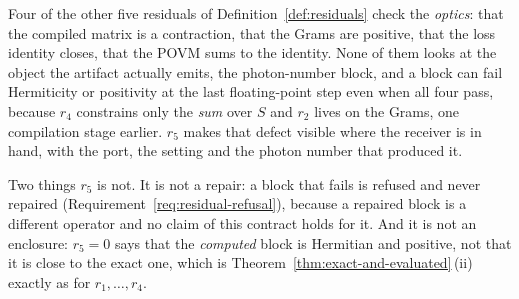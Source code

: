 
\begin{remark}\label{rem:res5why}
Four of the other five residuals of Definition~\ref{def:residuals} check the
\emph{optics}: that the compiled matrix is a contraction, that the Grams are
positive, that the loss identity closes, that the POVM sums to the identity.
None of them looks at the object the artifact actually emits, the
photon-number block, and a block can fail Hermiticity or positivity at the last
floating-point step even when all four pass, because $r_4$ constrains only the
\emph{sum} over $S$ and $r_2$ lives on the Grams, one compilation stage
earlier. $r_5$ makes that defect visible where the receiver is in hand, with
the port, the setting and the photon number that produced it.

Two things $r_5$ is not. It is not a repair: a block that fails is refused and
never repaired (Requirement~\ref{req:residual-refusal}), because a repaired
block is a different operator and no claim of this contract holds for it. And
it is not an enclosure: $r_5=0$ says that the \emph{computed} block is
Hermitian and positive, not that it is close to the exact one, which is
Theorem~\ref{thm:exact-and-evaluated}\,(ii) exactly as for $r_1,\dots,r_4$.
\end{remark}
